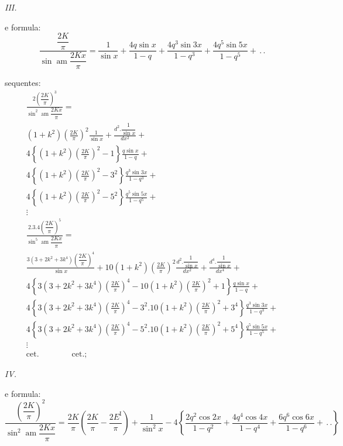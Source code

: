 \documentclass{article}
\begin{document}
\emph{III.}

e formula:
\[
\frac{\dfrac{2K}{\pi}}{\sin\operatorname{am}\dfrac{2Kx}{\pi}}=\frac{1}{\sin x}+\frac{4q\sin x}{1-q}+\frac{4q^{3}\sin 3x}{1-q^{3}}+\frac{4q^{5}\sin 5x}{1-q^{5}}+\,.\,.
\]

sequentes:
\[
\begin{gathered}
\frac{2\left(\dfrac{2K}{\pi}\right)^{3}}{\sin^{2}\operatorname{am}\dfrac{2Kx}{\pi}}=\\[1.5ex]
(1+k^{2})\left(\frac{2K}{\pi}\right)^{2}\frac{1}{\sin x}+\frac{d^{2}.\dfrac{1}{\sin x}}{dx^{2}}+\\[1.5ex]
4\left\{(1+k^{2})\left(\frac{2K}{\pi}\right)^{2}-1\right\}\frac{q\sin x}{1-q}+\\[1.5ex]
4\left\{(1+k^{2})\left(\frac{2K}{\pi}\right)^{2}-3^{2}\right\}\frac{q^{3}\sin 3x}{1-q^{3}}+\\[1.5ex]
4\left\{(1+k^{2})\left(\frac{2K}{\pi}\right)^{2}-5^{2}\right\}\frac{q^{5}\sin 5x}{1-q^{5}}+\\[1.5ex]
\vdots\\[1.5ex]
\frac{2.3.4\left(\dfrac{2K}{\pi}\right)^{5}}{\sin^{5}\operatorname{am}\dfrac{2Kx}{\pi}}=\\[1.5ex]
\frac{3(3+2k^{2}+3k^{4})\left(\dfrac{2K}{\pi}\right)^{4}}{\sin x}+10(1+k^{2})\left(\frac{2K}{\pi}\right)^{2}\frac{d^{2}.\dfrac{1}{\sin x}}{dx^{2}}+\frac{d^{4}.\dfrac{1}{\sin x}}{dx^{4}}+\\[1.5ex]
4\left\{3(3+2k^{2}+3k^{4})\left(\frac{2K}{\pi}\right)^{4}-10(1+k^{2})\left(\frac{2K}{\pi}\right)^{2}+1\right\}\frac{q\sin x}{1-q}+\\[1.5ex]
4\left\{3(3+2k^{2}+3k^{4})\left(\frac{2K}{\pi}\right)^{4}-3^{2}.10(1+k^{2})\left(\frac{2K}{\pi}\right)^{2}+3^{4}\right\}\frac{q^{3}\sin 3x}{1-q^{3}}+\\[1.5ex]
4\left\{3(3+2k^{2}+3k^{4})\left(\frac{2K}{\pi}\right)^{4}-5^{2}.10(1+k^{2})\left(\frac{2K}{\pi}\right)^{2}+5^{4}\right\}\frac{q^{5}\sin 5x}{1-q^{5}}+\\[1.5ex]
\vdots\\[1.5ex]
\text{cet.}\qquad\qquad\text{cet.};
\end{gathered}
\]

\emph{IV.}

e formula:
\[
\frac{\left(\dfrac{2K}{\pi}\right)^{2}}{\sin^{2}\operatorname{am}\dfrac{2Kx}{\pi}}=\frac{2K}{\pi}\left(\frac{2K}{\pi}-\frac{2E^{\mathrm{I}}}{\pi}\right)+\frac{1}{\sin^{2}x}-4\left\{\frac{2q^{2}\cos 2x}{1-q^{2}}+\frac{4q^{4}\cos 4x}{1-q^{4}}+\frac{6q^{6}\cos 6x}{1-q^{6}}+\,.\,.\right\}
\]
\end{document}
